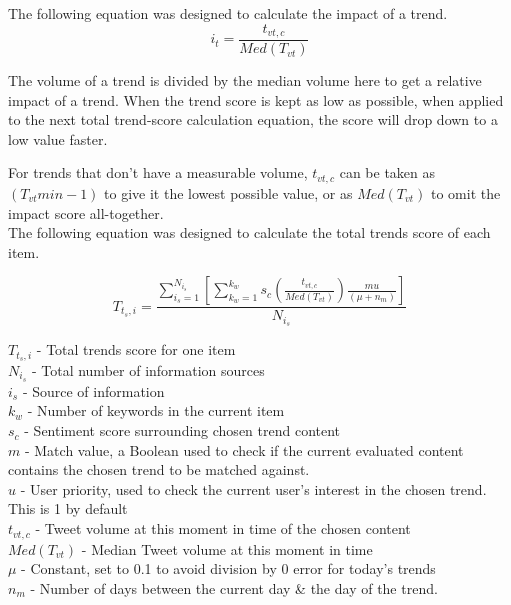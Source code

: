 \documentclass[manuscript,natbib=false, anonymous]{acmart}
\begin{document}
The following equation was designed to calculate the impact of a trend.
\begin{equation}
i_{t} = \frac{t_{vt,c}}{Med(T_{vt})}
\end{equation}

The volume of a trend is divided by the median volume here to get a relative impact of a trend. When the trend score is kept as low as possible, when applied to the next total trend-score calculation equation, the score will drop down to a low value faster.

For trends that don't have a measurable volume, $t_{vt,c}$ can be taken as $\left(T_{vt}{min} - 1\right)$ to give it the lowest possible value, or as $Med(T_{vt})$ to omit the impact score all-together.\\

The following equation was designed to calculate the total trends score of each item.

\begin{equation}
T_{t_{s},i} = \frac{\sum^{N_{i_{s}}}_{i_{s}=1} \left[\sum^{k_{w}}_{k_{w}=1} s_{c} \left(\frac{t_{vt,c}}{Med(T_{vt})}\right) \frac{m u}{\left(\mu + n_{m}\right)} \right]}{N_{i_{s}}}
\end{equation}

\noindent$T_{t_{s},i}$ - Total trends score for one item\\
$N_{i_{s}}$ - Total number of information sources\\
$i_{s}$ - Source of information\\
$k_{w}$ - Number of keywords in the current item\\
$s_{c}$ - Sentiment score surrounding chosen trend content\\
$m$ - Match value, a Boolean used to check if the current evaluated content contains the chosen trend to be matched against. \\
$u$ - User priority, used to check the current user's interest in the chosen trend. This is 1 by default\\
$t_{vt,c}$ - Tweet volume at this moment in time of the chosen content \\
$Med(T_{vt})$ - Median Tweet volume at this moment in time\\
$\mu$ - Constant, set to 0.1 to avoid division by 0 error for today's trends\\
$n_{m}$ - Number of days between the current day \& the day of the trend.\\
\end{document}

